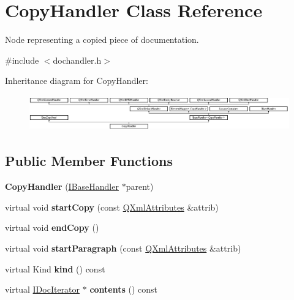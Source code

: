 \hypertarget{class_copy_handler}{}\section{Copy\+Handler Class Reference}
\label{class_copy_handler}


Node representing a copied piece of documentation.  




{\ttfamily \#include $<$dochandler.\+h$>$}

Inheritance diagram for Copy\+Handler\+:\begin{figure}[H]
\begin{center}
\leavevmode
\includegraphics[height=1.545894cm]{class_copy_handler}
\end{center}
\end{figure}
\subsection*{Public Member Functions}
\begin{DoxyCompactItemize}
\item 
\mbox{\label{class_copy_handler_ac31db342ed4dedf97dd9cd71b318906a}} 
{\bfseries Copy\+Handler} (\mbox{\hyperlink{class_i_base_handler}{I\+Base\+Handler}} $\ast$parent)
\item 
\mbox{\label{class_copy_handler_a6e0e7a8dd643335e4d66ec9e5f5c19be}} 
virtual void {\bfseries start\+Copy} (const \mbox{\hyperlink{class_q_xml_attributes}{Q\+Xml\+Attributes}} \&attrib)
\item 
\mbox{\label{class_copy_handler_ace7c864507bf32eb553aa4cc5bd5082c}} 
virtual void {\bfseries end\+Copy} ()
\item 
\mbox{\label{class_copy_handler_aaf9e562cc23df7b989ac4dbd09e8201b}} 
virtual void {\bfseries start\+Paragraph} (const \mbox{\hyperlink{class_q_xml_attributes}{Q\+Xml\+Attributes}} \&attrib)
\item 
\mbox{\label{class_copy_handler_a25691f4c2ff9d6ccc968d3175a08eb60}} 
virtual Kind {\bfseries kind} () const
\item 
\mbox{\label{class_copy_handler_aee03bedb7c54e4394647efff4f2e615c}} 
virtual \mbox{\hyperlink{class_i_doc_iterator}{I\+Doc\+Iterator}} $\ast$ {\bfseries contents} () const
\end{DoxyCompactItemize}
